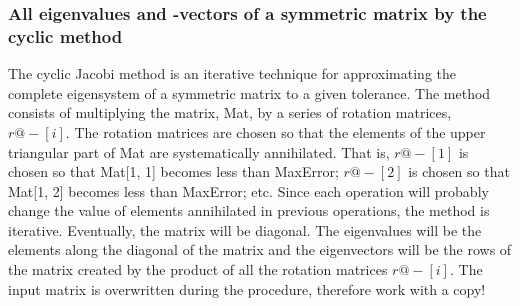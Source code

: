 \subsubsection{All eigenvalues and -vectors of a symmetric matrix by the cyclic  method}

The cyclic Jacobi method is an iterative technique for approximating the complete eigensystem of a symmetric matrix to a given tolerance. The method consists of multiplying the matrix, Mat, by a series of rotation matrices, \(r@-[i] \).  The rotation matrices are chosen so that the elements of the upper triangular part of Mat are systematically annihilated.  That is, \(r@-[1] \) is chosen so that Mat[1, 1] becomes less than MaxError; \(r@-[2] \) is chosen so that Mat[1, 2] becomes less than  MaxError; etc. Since each operation will probably change the value of elements annihilated in previous operations, the method is iterative. Eventually, the matrix will be diagonal. The eigenvalues will be the elements along the diagonal of the matrix and the eigenvectors will be the rows of the matrix created by the product of all the rotation matrices \(r@-[i] \). The input matrix is overwritten during the procedure, therefore work with a copy!

